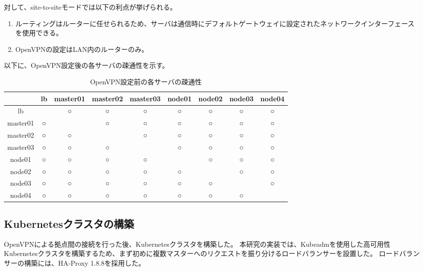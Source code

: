 対して、site-to-siteモードでは以下の利点が挙げられる。

\begin{enumerate}
  \item ルーティングはルーターに任せられるため、サーバは通信時にデフォルトゲートウェイに設定されたネットワークインターフェースを使用できる。
  \item OpenVPNの設定はLAN内のルーターのみ。
\end{enumerate}

以下に、OpenVPN設定後の各サーバの疎通性を示す。

\begin{table}[htb]
  \begin{center}
    \caption{OpenVPN設定前の各サーバの疎通性}
    \begin{tabular}{|c|c|c|c|c|c|c|c|c|} \hline
      & lb & master01 & master02 & master03 & node01 & node02 & node03 & node04 \\ \hline
      lb & \ & ○ & ○ & ○ & ○ & ○ & ○ & ○ \\ \hline
      master01 & ○ & \ & ○ & ○ & ○ & ○ & ○ & ○ \\ \hline
      master02 & ○ & ○ & \ & ○ & ○ & ○ & ○ & ○ \\ \hline
      master03 & ○ & ○ & ○ & \ & ○ & ○ & ○ & ○ \\ \hline
      node01 & ○ & ○ & ○ & ○ & \ & ○ & ○ & ○ \\ \hline
      node02 & ○ & ○ & ○ & ○ & ○ & \ & ○ & ○ \\ \hline
      node03 & ○ & ○ & ○ & ○ & ○ & ○ & \ & ○ \\ \hline
      node04 & ○ & ○ & ○ & ○ & ○ & ○ & ○ & \ \\ \hline
    \end{tabular}
  \end{center}
\end{table}

\subsection{Kubernetesクラスタの構築}

OpenVPNによる拠点間の接続を行った後、Kubernetesクラスタを構築した。
本研究の実装では、Kubeadmを使用した高可用性Kubernetesクラスタを構築するため、まず初めに複数マスターへのリクエストを振り分けるロードバランサーを設置した。
ロードバランサーの構築には、HA-Proxy 1.8.8を採用した。\\

